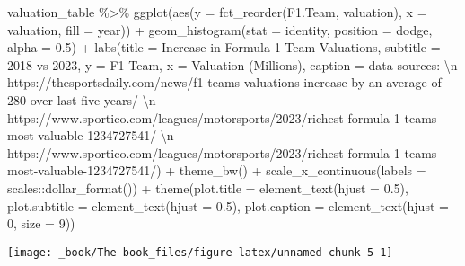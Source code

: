\documentclass[
]{book}
\newenvironment{Shaded}{\begin{snugshade}}{\end{snugshade}}
\newcommand{\AttributeTok}[1]{\textcolor[rgb]{0.77,0.63,0.00}{#1}}
\newcommand{\DecValTok}[1]{\textcolor[rgb]{0.00,0.00,0.81}{#1}}
\newcommand{\FloatTok}[1]{\textcolor[rgb]{0.00,0.00,0.81}{#1}}
\newcommand{\FunctionTok}[1]{\textcolor[rgb]{0.00,0.00,0.00}{#1}}
\newcommand{\NormalTok}[1]{#1}
\newcommand{\SpecialCharTok}[1]{\textcolor[rgb]{0.00,0.00,0.00}{#1}}
\newcommand{\StringTok}[1]{\textcolor[rgb]{0.31,0.60,0.02}{#1}}
\begin{document}
\begin{Shaded}
\begin{Highlighting}[]
\NormalTok{valuation\_table }\SpecialCharTok{\%\textgreater{}\%}
  \FunctionTok{ggplot}\NormalTok{(}\FunctionTok{aes}\NormalTok{(}\AttributeTok{y =} \FunctionTok{fct\_reorder}\NormalTok{(F1.Team, valuation), }\AttributeTok{x =}\NormalTok{ valuation, }\AttributeTok{fill =}\NormalTok{ year)) }\SpecialCharTok{+}
  \FunctionTok{geom\_histogram}\NormalTok{(}\AttributeTok{stat =} \StringTok{\textquotesingle{}identity\textquotesingle{}}\NormalTok{, }\AttributeTok{position =} \StringTok{\textquotesingle{}dodge\textquotesingle{}}\NormalTok{, }\AttributeTok{alpha =} \FloatTok{0.5}\NormalTok{) }\SpecialCharTok{+}
  \FunctionTok{labs}\NormalTok{(}\AttributeTok{title =} \StringTok{\textquotesingle{}Increase in Formula 1 Team Valuations\textquotesingle{}}\NormalTok{,}
       \AttributeTok{subtitle =} \StringTok{\textquotesingle{}2018 vs 2023\textquotesingle{}}\NormalTok{,}
       \AttributeTok{y =} \StringTok{\textquotesingle{}F1 Team\textquotesingle{}}\NormalTok{,}
       \AttributeTok{x =} \StringTok{\textquotesingle{}Valuation (Millions)\textquotesingle{}}\NormalTok{,}
       \AttributeTok{caption =} \StringTok{\textquotesingle{}data sources:  }\SpecialCharTok{\textbackslash{}n}\StringTok{ https://thesportsdaily.com/news/f1{-}teams{-}valuations{-}increase{-}by{-}an{-}average{-}of{-}280{-}over{-}last{-}five{-}years/ }\SpecialCharTok{\textbackslash{}n}\StringTok{ https://www.sportico.com/leagues/motorsports/2023/richest{-}formula{-}1{-}teams{-}most{-}valuable{-}1234727541/ }\SpecialCharTok{\textbackslash{}n}\StringTok{ https://www.sportico.com/leagues/motorsports/2023/richest{-}formula{-}1{-}teams{-}most{-}valuable{-}1234727541/\textquotesingle{}}\NormalTok{) }\SpecialCharTok{+}
  \FunctionTok{theme\_bw}\NormalTok{() }\SpecialCharTok{+}
  \FunctionTok{scale\_x\_continuous}\NormalTok{(}\AttributeTok{labels =}\NormalTok{ scales}\SpecialCharTok{::}\FunctionTok{dollar\_format}\NormalTok{()) }\SpecialCharTok{+}
  \FunctionTok{theme}\NormalTok{(}\AttributeTok{plot.title =} \FunctionTok{element\_text}\NormalTok{(}\AttributeTok{hjust =} \FloatTok{0.5}\NormalTok{),}
        \AttributeTok{plot.subtitle =} \FunctionTok{element\_text}\NormalTok{(}\AttributeTok{hjust =} \FloatTok{0.5}\NormalTok{),}
        \AttributeTok{plot.caption =} \FunctionTok{element\_text}\NormalTok{(}\AttributeTok{hjust =} \DecValTok{0}\NormalTok{, }\AttributeTok{size =} \DecValTok{9}\NormalTok{))}
\end{Highlighting}
\end{Shaded}

\begin{center}\texttt{[image: \_book/The-book\_files/figure-latex/unnamed-chunk-5-1]} \end{center}
\end{document}
